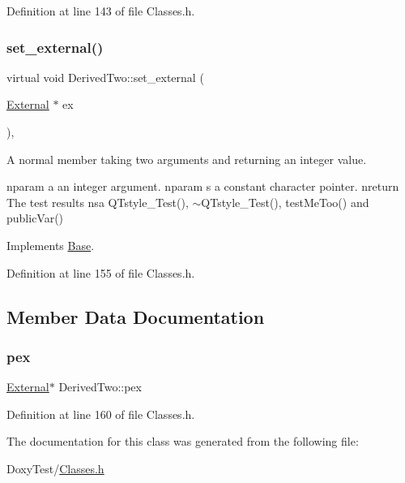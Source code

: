 Definition at line 143 of file Classes.\+h.

\mbox{\label{class_derived_two_a84a5387e229abb415d74fb4ed8a5d913}} 
\subsubsection{\texorpdfstring{set\+\_\+external()}{set\_external()}}
{\footnotesize\ttfamily virtual void Derived\+Two\+::set\+\_\+external (\begin{DoxyParamCaption}\item[{\hyperlink{class_external}{External} $\ast$}]{ex }\end{DoxyParamCaption})\hspace{0.3cm}{\ttfamily [inline]}, {\ttfamily [virtual]}}



A normal member taking two arguments and returning an integer value. 

nparam a an integer argument. nparam s a constant character pointer. nreturn The test results nsa Q\+Tstyle\+\_\+\+Test(), $\sim$\+Q\+Tstyle\+\_\+\+Test(), test\+Me\+Too() and public\+Var() 

Implements \hyperlink{class_base_a87ec2d3dcffa1d22d4fe4f651f625d49}{Base}.



Definition at line 155 of file Classes.\+h.



\subsection{Member Data Documentation}
\mbox{\label{class_derived_two_a802d77367aae0f23c503def0befd6a88}} 
\subsubsection{\texorpdfstring{pex}{pex}}
{\footnotesize\ttfamily \hyperlink{class_external}{External}$\ast$ Derived\+Two\+::pex}



Definition at line 160 of file Classes.\+h.



The documentation for this class was generated from the following file\+:\begin{DoxyCompactItemize}
\item 
Doxy\+Test/\hyperlink{_classes_8h}{Classes.\+h}\end{DoxyCompactItemize}
